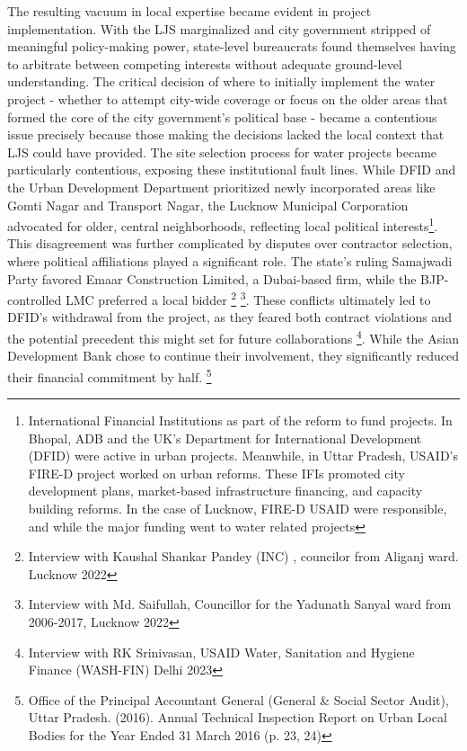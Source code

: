The resulting vacuum in local expertise became evident in project implementation. With the LJS marginalized and city government stripped of meaningful policy-making power, state-level bureaucrats found themselves having to arbitrate between competing interests without adequate ground-level understanding. The critical decision of where to initially implement the water project - whether to attempt city-wide coverage or focus on the older areas that formed the core of the city government's political base - became a contentious issue precisely because those making the decisions lacked the local context that LJS could have provided.
The site selection process for water projects became particularly contentious, exposing these institutional fault lines. While DFID and the Urban Development Department prioritized newly incorporated areas like Gomti Nagar and Transport Nagar, the Lucknow Municipal Corporation advocated for older, central neighborhoods, reflecting local political interests\footnote{International Financial Institutions as part of the reform to fund projects. In Bhopal, ADB and the UK's Department for International Development (DFID) were active in urban projects. Meanwhile, in Uttar Pradesh, USAID's FIRE-D project worked on urban reforms. These IFIs promoted city development plans, market-based infrastructure financing, and capacity building reforms. In the case of Lucknow, FIRE-D USAID were responsible, and while  the major funding went to water related projects}. This disagreement was further complicated by disputes over contractor selection, where political affiliations played a significant role. The state's ruling Samajwadi Party favored Emaar Construction Limited, a Dubai-based firm, while the BJP-controlled LMC preferred a local bidder \footnote{Interview with Kaushal Shankar Pandey (INC) , councilor from Aliganj ward. Lucknow 2022
} \footnote{Interview with Md. Saifullah, Councillor for the Yadunath Sanyal ward from 2006-2017, Lucknow 2022}. These conflicts ultimately led to DFID's withdrawal from the project, as they feared both contract violations and the potential precedent this might set for future collaborations \footnote{Interview with RK Srinivasan, USAID Water, Sanitation and Hygiene Finance (WASH-FIN) Delhi 2023
}. While the Asian Development Bank chose to continue their involvement, they significantly reduced their financial commitment by half. \footnote{Office of the Principal Accountant General (General & Social Sector Audit), Uttar Pradesh. (2016). Annual Technical Inspection Report on Urban Local Bodies for the Year Ended 31 March 2016 (p. 23, 24)}

